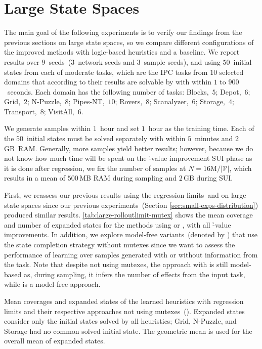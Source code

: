 \section{Large State Spaces}
\label{sec:large-experiments}

The main goal of the following experiments is to verify our findings from the previous sections on large state spaces, so we compare different configurations of the improved methods with logic-based heuristics and a baseline. We report results over $9$~seeds~($3$~network seeds and $3$~sample seeds), and using $50$~initial states from each of \citet{ferber2022neural} moderate tasks, which are the IPC tasks from $10$ selected domains that according to their results are solvable by \gbfs with \hff within $1$ to $900$~seconds. Each domain has the following number of tasks: Blocks,~$5$; Depot,~$6$; Grid,~$2$; N-Puzzle,~$8$; Pipes-NT,~$10$; Rovers,~$8$; Scanalyzer,~$6$; Storage,~$4$; Transport,~$8$; VisitAll,~$6$.

We generate samples within $1$~hour and set $1$~hour as the training time. Each of the $50$~initial states must be solved separately with \gbfs within $5$~minutes and $2$\,GB~RAM. Generally, more samples yield better results; however, because we do not know how much time will be spent on the \h-value improvement SUI phase as it is done after regression, we fix the number of samples at $N = 16\text{M} / |\mathcal{V}|$, which results in a mean of $500$\,MB RAM during sampling and $2$\,GB during SUI.

First, we reassess our previous results using the regression limits~\rlfacts and \rlmeanfx on large state spaces since our previous experiments~(Section \ref{sec:small-exps-distribution}) produced similar results. \cref{tab:large-rolloutlimit-mutex} shows the mean coverage and number of expanded states for the methods using \rlfacts or \rlmeanfx, with all \h-value improvements. In addition, we explore model-free variants~(denoted by \hnnnomutex) that use the state completion strategy without mutexes since we want to assess the performance of learning over samples generated with or without information from the task. Note that despite not using mutexes, the approach with \hnnnomutexl{\rlmeanfx} is still model-based as, during sampling, it infers the number of effects from the input task, while \hnnnomutexl{\rlfacts} is a model-free approach.

\begin{table}[tb]
    \caption[Results of the learned heuristics with and without mutexes.]{Mean coverages and expanded states of the learned heuristics with regression limits and their respective approaches not using mutexes~(\hnnnomutex). Expanded states consider only the initial states solved by all heuristics; Grid, N-Puzzle, and Storage had no common solved initial state. The geometric mean is used for the overall mean of expanded states.}
    \label{tab:large-rolloutlimit-mutex}
    \addmargin
    \centering
    
\end{table}

